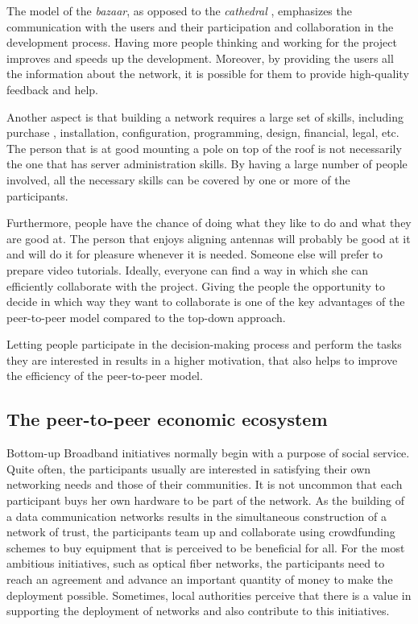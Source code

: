 \documentclass[journal]{IEEEtran}
\begin{document}
The model of the \emph{bazaar}, as opposed to the \emph{cathedral} \cite{raymond1999cb}, emphasizes the communication with the users and their participation and collaboration in the development process.
Having more people thinking and working for the project improves and speeds up the development.
Moreover, by providing the users all the information about the network, it is possible for them to provide high-quality feedback and help.

Another aspect is that building a network requires a large set of skills, including purchase , installation, configuration, programming, design, financial, legal, etc.
The person that is at good mounting a pole on top of the roof is not necessarily the one that has server administration skills.
By having a large number of people involved, all the necessary skills can be covered by one or more of the participants.

Furthermore, people have the chance of doing what they like to do and what they are good at.
The person that enjoys aligning antennas will probably be good at it and will do it for pleasure whenever it is needed.
Someone else will prefer to prepare video tutorials.
Ideally, everyone can find a way in which she can efficiently collaborate with the project.
Giving the people the opportunity to decide in which way they want to collaborate is one of the key advantages of the peer-to-peer model compared to the top-down approach.

Letting people participate in the decision-making process and perform the tasks they are interested in results in a higher motivation, that also helps to improve the efficiency of the peer-to-peer model.


\subsection{The peer-to-peer economic ecosystem}

Bottom-up Broadband initiatives normally begin with a purpose of social service.
Quite often, the participants usually are interested in satisfying their own networking needs and those of their communities.
It is not uncommon that each participant buys her own hardware to be part of the network.
As the building of a data communication networks results in the simultaneous construction of a network of trust, the participants team up and collaborate using crowdfunding schemes to buy equipment that is perceived to be beneficial for all.
For the most ambitious initiatives, such as optical fiber networks, the participants need to reach an agreement and advance an important quantity of money to make the deployment possible.
Sometimes, local authorities perceive that there is a value in supporting the deployment of networks and also contribute to this initiatives.
\end{document}
